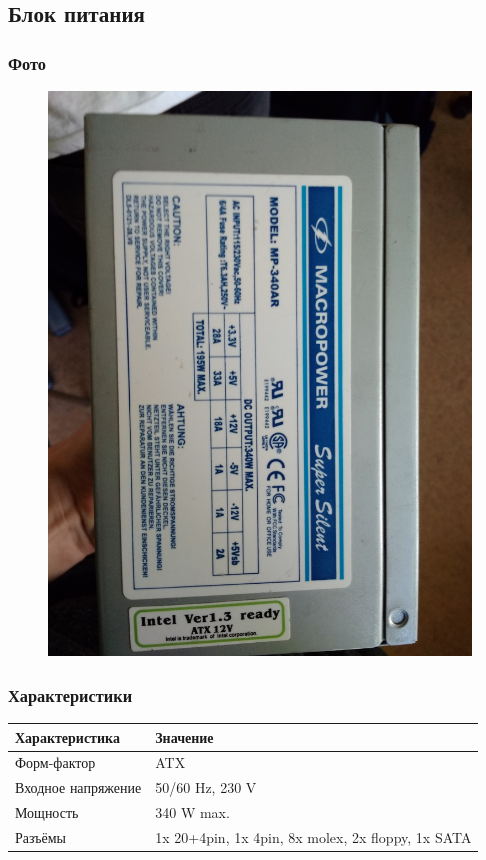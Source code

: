 \documentclass[a4paper]{article}
\begin{document}
\subsection{Блок питания}
\subsubsection{Фото}
\begin{figure}[H]
\centering
\includegraphics[scale=0.1]{power.jpg} 
\end{figure}
\subsubsection{Характеристики}
\begin{table}[H]
\centering
\begin{tabular}{|l|l|}
\hline
Характеристика & Значение \\
\hline
Форм-фактор & ATX \\
Входное напряжение & 50/60 Hz, 230 V \\
Мощность & 340 W max. \\
Разъёмы & 1x 20+4pin, 1x 4pin, 8x molex, 2x floppy, 1x SATA \\
\hline
\end{tabular} 
\end{table}
\end{document}
